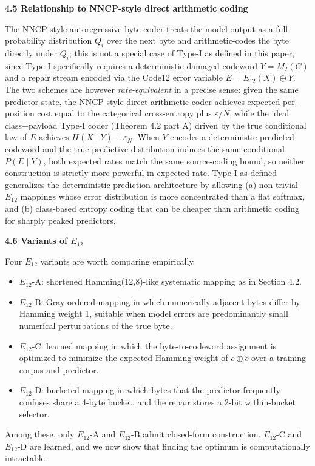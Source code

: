 \documentclass[
]{article}
\begin{document}
\textbf{4.5 Relationship to NNCP-style direct arithmetic coding}

The NNCP-style autoregressive byte coder treats the model output as
a full probability distribution $Q_i$ over the next byte and
arithmetic-codes the byte directly under $Q_i$; this is not a
special case of Type-I as defined in this paper, since Type-I
specifically requires a deterministic damaged codeword
$Y = M_I(C)$ and a repair stream encoded via the Code12 error
variable $E = E_{12}(X) \oplus Y$. The two schemes are however
\emph{rate-equivalent} in a precise sense: given the same predictor
state, the NNCP-style direct arithmetic coder achieves expected
per-position cost equal to the categorical cross-entropy plus
$\varepsilon/N$, while the ideal class+payload Type-I coder
(Theorem 4.2 part A) driven by the true conditional law of $E$
achieves $H(X \mid Y) + \varepsilon_N$. When $Y$ encodes a
deterministic predicted codeword and the true predictive
distribution induces the same conditional $P(E \mid Y)$, both
expected rates match the same source-coding bound, so neither
construction is strictly more powerful in expected rate. Type-I as
defined generalizes the deterministic-prediction architecture by
allowing (a) non-trivial $E_{12}$ mappings whose error distribution
is more concentrated than a flat softmax, and (b) class-based
entropy coding that can be cheaper than
arithmetic coding for sharply peaked predictors.

\textbf{4.6 Variants of $E_{12}$}

Four $E_{12}$ variants are worth comparing empirically.
\begin{itemize}
\item
  $E_{12}$-A: shortened Hamming(12,8)-like systematic mapping as in
  Section 4.2.
\item
  $E_{12}$-B: Gray-ordered mapping in which numerically adjacent bytes
  differ by Hamming weight 1, suitable when model errors are
  predominantly small numerical perturbations of the true byte.
\item
  $E_{12}$-C: learned mapping in which the byte-to-codeword assignment
  is optimized to minimize the expected Hamming weight of $c \oplus
  \hat{c}$ over a training corpus and predictor.
\item
  $E_{12}$-D: bucketed mapping in which bytes that the predictor
  frequently confuses share a 4-byte bucket, and the repair stores a
  2-bit within-bucket selector.
\end{itemize}

Among these, only $E_{12}$-A and $E_{12}$-B admit closed-form
construction. $E_{12}$-C and $E_{12}$-D are learned, and we now show
that finding the optimum is computationally intractable.
\end{document}
